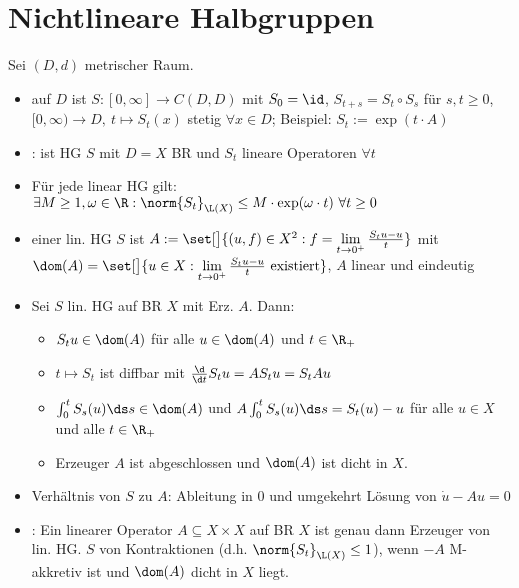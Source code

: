 	\section{Nichtlineare Halbgruppen}
	Sei $(D,d)$ metrischer Raum.
	\begin{itemize}
		\item {} auf $D$ ist $S\colon[0,\infty]\to C(D,D)$ mit $S_0=\id$, $S_{t+s}=S_t\circ S_s$ für $s,t\geq0$, $[0,\infty)\to D,~t\mapsto S_t(x)$ stetig $\forall x\in D$; Beispiel: $S_t:=\exp(t\cdot A)$
		\item {}: ist HG $S$ mit $D=X$ BR und $S_t$ lineare Operatoren $\forall t$
		\item Für jede linear HG gilt: $\exists M\geq1,\omega\in\R:\norm{S_t}_{\L(X)}\leq M\cdot\exp(\omega\cdot t)~\forall t\geq0$
		\item {} einer lin. HG $S$ ist $A:=\set[\big]{(u,f)\in X^2:f=\lim\limits_{t\to0^+}\frac{S_t u-u}{t}}$ mit\\ $\dom(A)=\set[\big]{u\in X:\lim\limits_{t\to 0^+}\frac{S_t u-u}{t}\text{ existiert}}$, $A$ linear und eindeutig
		\item Sei $S$ lin. HG auf BR $X$ mit Erz. $A$. Dann:
		\begin{itemize}
			\item $S_t u\in\dom(A)$ für alle $u\in\dom(A)$ und $t\in\R_+$
			\item $t\mapsto S_t$ ist diffbar mit $\frac{\d}{\d t}S_t u=A S_t u=S_t A u$
			\item $\int_0^t S_s(u)\ds s\in\dom(A)$ und $A\int_0^t S_s(u)\ds s=S_t(u)-u$ für alle $u\in X$ und alle $t\in\R_+$
			\item Erzeuger $A$ ist abgeschlossen und $\dom(A)$ ist dicht in $X$.
		\end{itemize}
		\item Verhältnis von $S$ zu $A$: Ableitung in 0 und umgekehrt Lösung von $\dot{u}-Au=0$
		\item {}:
		Ein linearer Operator $A\subseteq X\times X$ auf BR $X$ ist genau dann Erzeuger von lin. HG. $S$ von Kontraktionen (d.h. $\norm{S_t}_{\L(X)}\leq 1$), wenn $-A$ M-akkretiv ist und $\dom(A)$ dicht in $X$ liegt.

\end{itemize}
